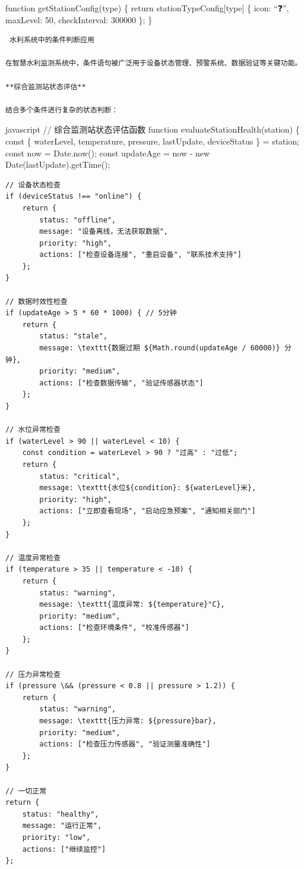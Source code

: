 {function getStationConfig(type) \{ return stationTypeConfig{[}type{]} \textbar\textbar{} \{ icon: ``❓'', maxLevel: 50, checkInterval: 300000 \}; \}

\begin{lstlisting}
 水利系统中的条件判断应用

在智慧水利监测系统中，条件语句被广泛用于设备状态管理、预警系统、数据验证等关键功能。

**综合监测站状态评估**

结合多个条件进行复杂的状态判断：
\end{lstlisting}

javascript // 综合监测站状态评估函数 function evaluateStationHealth(station) \{ const \{ waterLevel, temperature, pressure, lastUpdate, deviceStatus \} = station; const now = Date.now(); const updateAge = now - new Date(lastUpdate).getTime();

\begin{verbatim}
// 设备状态检查
if (deviceStatus !== "online") {
    return { 
        status: "offline", 
        message: "设备离线，无法获取数据", 
        priority: "high",
        actions: ["检查设备连接", "重启设备", "联系技术支持"]
    };
}

// 数据时效性检查
if (updateAge > 5 * 60 * 1000) { // 5分钟
    return { 
        status: "stale", 
        message: \texttt{数据过期 ${Math.round(updateAge / 60000)} 分钟}, 
        priority: "medium",
        actions: ["检查数据传输", "验证传感器状态"]
    };
}

// 水位异常检查
if (waterLevel > 90 || waterLevel < 10) {
    const condition = waterLevel > 90 ? "过高" : "过低";
    return { 
        status: "critical", 
        message: \texttt{水位${condition}: ${waterLevel}米}, 
        priority: "high",
        actions: ["立即查看现场", "启动应急预案", "通知相关部门"]
    };
}

// 温度异常检查
if (temperature > 35 || temperature < -10) {
    return { 
        status: "warning", 
        message: \texttt{温度异常: ${temperature}°C}, 
        priority: "medium",
        actions: ["检查环境条件", "校准传感器"]
    };
}

// 压力异常检查
if (pressure \&& (pressure < 0.8 || pressure > 1.2)) {
    return { 
        status: "warning", 
        message: \texttt{压力异常: ${pressure}bar}, 
        priority: "medium",
        actions: ["检查压力传感器", "验证测量准确性"]
    };
}

// 一切正常
return { 
    status: "healthy", 
    message: "运行正常", 
    priority: "low",
    actions: ["继续监控"]
};
\end{verbatim}

}
